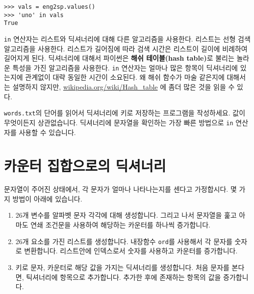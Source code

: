 \beforeverb
\begin{verbatim}
>>> vals = eng2sp.values()
>>> 'uno' in vals
True
\end{verbatim}
\afterverb
%

{\tt in} 연산자는 리스트와 딕셔너리에 대해 다른 알고리즘을 사용한다. 리스트는 선형 검색 알고리즘을 사용한다.
리스트가 길어짐에 따라 검색 시간은 리스트이 길이에 비례하여 길어지게 된다. 딕셔너리에 대해서 파이썬은 {\bf 해쉬 테이블(hash table)}로 불리는 
놀라운 특성을 가진 알고리즘을 사용한다. {\tt in} 연산자는 얼마나 많은 항목이 딕셔너리에 있는지에 관계없이 대략 동일한 시간이 소요된다.
왜 해쉬 함수가 마술 같은지에 대해서는 설명하지 않지만, \url{wikipedia.org/wiki/Hash_table} 에 좀더 많은 것을 읽을 수 있다.



\begin{ex}
\label{wordlist2}


{\tt words.txt}의 단어를 읽어서 딕셔너리에 키로 저장하는 프로그램을 작성하세요.
값이 무엇이든지 상관없습니다. 딕셔너리에 문자열을 확인하는 가장 빠른 방법으로 {\tt in} 연산자를 사용할 수 있습니다.

\end{ex}


\section{카운터 집합으로의 딕셔너리}
\label{histogram}


문자열이 주어진 상태에서, 각 문자가 얼마나 나타나는지를 센다고 가정합시다.
몇 가지 방법이 아래에 있습니다.

\begin{enumerate}

\item 26개 변수를 알파벳 문자 각각에 대해 생성합니다. 그리고 나서 문자열을 훑고 아마도 연쇄 조건문을 사용하여 해당하는 카운터를 하나씩 증가합니다.

\item 26개 요소를 가진 리스트를 생성합니다. 내장함수 {\tt ord}를 사용해서 각 문자를 숫자로 변환합니다. 리스트안에 인덱스로서 숫자를 사용하고 카운터를 증가합니다.

\item 키로 문자, 카운터로 해당 값을 가지는 딕셔너리를 생성합니다. 처음 문자를 본다면, 틱셔너리에 항목으로 추가합니다.
추가한 후에 존재하는 항목의 값을 증가합니다.

\end{enumerate}

